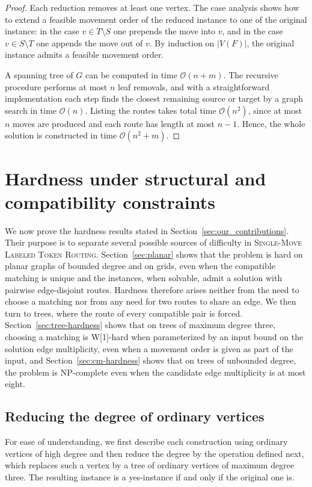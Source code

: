 \documentclass[a4paper,USenglish,thm-restate]{lipics-v2021}
\theoremstyle{problemstyle}
\begin{document}
\begin{proof}
Each reduction removes at least one vertex. The case analysis shows how to
extend a feasible movement order of the reduced instance to one of the original
instance: in the case $v\in T\setminus S$ one prepends the move into $v$, and in
the case $v\in S\setminus T$ one appends the move out of $v$. By induction on
$|V(F)|$, the original instance admits a feasible movement order.

A spanning tree of $G$ can be computed in time $\mathcal{O}(n+m)$. The recursive
procedure performs at most $n$ leaf removals, and with a straightforward
implementation each step finds the closest remaining source or target by a graph
search in time $\mathcal{O}(n)$. Listing the routes takes total time
$\mathcal{O}(n^2)$, since at most $n$ moves are produced and each route has
length at most $n-1$. Hence, the whole solution is constructed in time
$\mathcal{O}(n^2+m)$.
\end{proof}

\section{Hardness under structural and compatibility constraints}
\label{sec:hardness}

We now prove the hardness results stated in Section~\ref{sec:our_contributions}.
Their purpose is to separate several possible sources of difficulty in
\textsc{Single-Move Labeled Token Routing}. Section~\ref{sec:planar} shows
that the problem is hard on planar graphs of bounded degree and on grids,
even when the compatible matching is unique and the instances, when
solvable, admit a solution with pairwise edge-disjoint routes. Hardness
therefore arises neither from the need to choose a matching nor from any
need for two routes to share an edge. We then turn to trees, where the
route of every compatible pair is forced. Section~\ref{sec:tree-hardness}
shows that on trees of maximum degree three, choosing a matching is
\textsf{W}[1]-hard when parameterized by an input bound on the solution edge
multiplicity, even when a movement order is given as part of the input, and
Section~\ref{sec:cm-hardness} shows that on trees of unbounded degree, the
problem is \textsf{NP}-complete even when the candidate edge multiplicity is
at most eight.

\subsection{Reducing the degree of ordinary vertices}
\label{sec:degree-reduction}
For ease of understanding, we first describe each construction using ordinary
vertices of high degree and then reduce the degree by the operation defined
next, which replaces such a vertex by a tree of ordinary vertices of maximum
degree three. The resulting instance is a yes-instance if and only if the
original one is.
\end{document}
